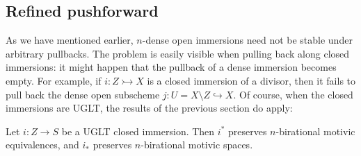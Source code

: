 \subsection{Refined pushforward}\label{3.2}
As we have mentioned earlier, $n$-dense open immersions need not be stable under arbitrary pullbacks. The problem is easily visible when pulling back along closed immersions: it might happen that the pullback of a dense immersion becomes empty. For example, if $i: Z\rightarrowtail X$ is a closed immersion of a divisor, then it fails to pull back the dense open subscheme $j:U=X\setminus Z\hookrightarrow X$. Of course, when the closed immersions are UGLT, the results of the previous section do apply:
\begin{cor}
    Let $i:Z\to S$ be a UGLT closed immersion. Then $i^*$ preserves $n$-birational motivic equivalences, and $i_*$ preserves $n$-birational motivic spaces.
\end{cor}


